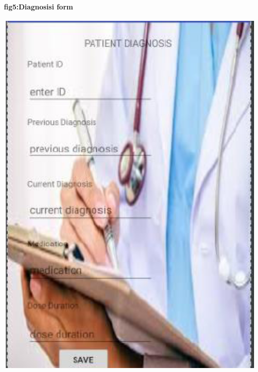 \documentclass[12pt,]{article}
\begin{document}
\paragraph{fig5:Diagnosisi form }
\includegraphics[width=1.0\textwidth]{./capture5}\\[0.1in]
\end{document}
